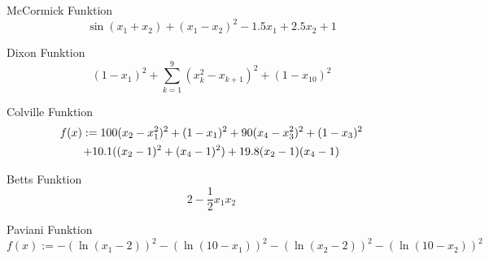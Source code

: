 \begin{testfunction}
McCormick Funktion
\[
\sin(x_1+x_2) + (x_1-x_2)^2 - 1.5x_1 + 2.5x_2 + 1
\]
\end{testfunction}

\begin{testfunction}
Dixon Funktion
\[
(1-x_1)^2 + \sum_{k=1}^{9} (x_k^2-x_{k+1})^2 + (1-x_{10})^2
\]
\end{testfunction}

\begin{testfunction}
Colville Funktion
\begin{multline}
  f(x) := 100(x_2-x_1^2)^2 + (1-x_1)^2 + 90(x_4-x_3^2)^2 + (1-x_3)^2 \\
    + 10.1((x_2-1)^2 + (x_4-1)^2) + 19.8(x_2-1)(x_4-1) \notag
\end{multline}
\end{testfunction}

\begin{testfunction}
Betts Funktion
\[
2 - \frac{1}{2}x_1x_2
\]
\end{testfunction}

\begin{testfunction}
Paviani Funktion
\[
  f(x) := - (\ln(x_1-2))^2 - (\ln(10-x_1))^2
            - (\ln(x_2-2))^2 - (\ln(10-x_2))^2
\]
\end{testfunction}
